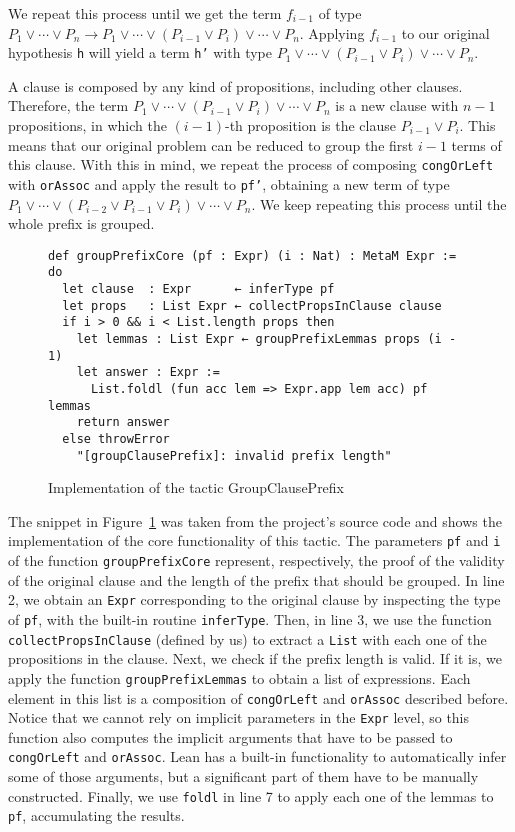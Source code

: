 We repeat this process until we get the term $f_{i - 1}$ of type $P_{1} \vee \cdots \vee P_{n} \rightarrow P_{1} \vee \cdots \vee (P_{i - 1} \vee P_{i}) \vee \cdots \vee P_{n}$. Applying $f_{i - 1}$ to our original hypothesis \texttt{h} will yield a term \texttt{h'} with type $P_{1} \vee \cdots \vee (P_{i - 1} \vee P_{i}) \vee \cdots \vee P_{n}$.

A clause is composed by any kind of propositions, including other clauses.
Therefore, the term $P_{1} \vee \cdots \vee (P_{i - 1} \vee P_{i}) \vee \cdots \vee P_{n}$ is a new clause
with $n - 1$ propositions, in which the $(i - 1)$-th proposition is the clause
$P_{i - 1} \vee P_{i}$. This means that our original problem can be reduced to
group the first $i - 1$ terms of this clause.
With this in mind, we repeat the process of composing \texttt{congOrLeft} with
\texttt{orAssoc} and apply the result to \texttt{pf'}, obtaining
a new term of type $P_{1} \vee \cdots \vee (P_{i - 2} \vee P_{i - 1} \vee P_{i}) \vee \cdots \vee P_{n}$.
We keep repeating this process until the whole prefix is grouped.


\begin{figure}[t]
\begin{verbatim}
def groupPrefixCore (pf : Expr) (i : Nat) : MetaM Expr := do
  let clause  : Expr      ← inferType pf
  let props   : List Expr ← collectPropsInClause clause
  if i > 0 && i < List.length props then
    let lemmas : List Expr ← groupPrefixLemmas props (i - 1)
    let answer : Expr :=
      List.foldl (fun acc lem => Expr.app lem acc) pf lemmas
    return answer
  else throwError
    "[groupClausePrefix]: invalid prefix length"
\end{verbatim}
\caption{Implementation of the tactic GroupClausePrefix}\label{groupClause}
\end{figure}

The snippet in Figure~\ref{groupClause} was taken from the project's source code and shows the
implementation of the core functionality of this tactic.
The parameters \texttt{pf} and \texttt{i} of the function \texttt{groupPrefixCore}
represent, respectively, the proof of the validity of the original clause
and the length of the prefix that should be grouped. In line 2, we obtain
an \texttt{Expr} corresponding to the original clause by inspecting the type
of \texttt{pf}, with the built-in routine \texttt{inferType}. Then, in line 3,
we use the function \texttt{collectPropsInClause} (defined by us) to
extract a \texttt{List} with each one of the propositions in the clause.
Next, we check if the prefix length is valid. If it is, we apply the function
\texttt{groupPrefixLemmas} to obtain a list of expressions. Each element in this list
is a composition of \texttt{congOrLeft} and \texttt{orAssoc} described before.
Notice that we cannot rely on implicit parameters in the \texttt{Expr} level, so
this function also computes the implicit arguments that have to be
passed to \texttt{congOrLeft} and \texttt{orAssoc}. Lean has a built-in
functionality to automatically infer some of those arguments, but a significant
part of them have to be manually constructed. Finally, we use \texttt{foldl}
in line 7 to apply each one of the lemmas to \texttt{pf}, accumulating the results.

